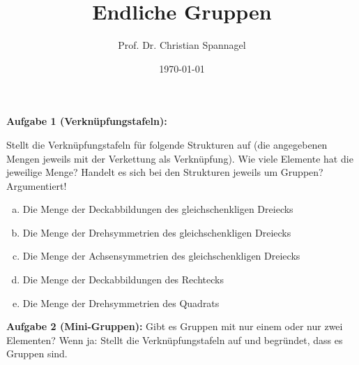 \documentclass{cssheet}
\title{Endliche Gruppen}
\author{Prof. Dr. Christian Spannagel}
\date{\today}
\begin{document}
\printtitle


\textbf{Aufgabe 1 (Verknüpfungstafeln):} 

Stellt die Verknüpfungstafeln für folgende Strukturen auf (die angegebenen Mengen jeweils mit der Verkettung als Verknüpfung). Wie viele Elemente hat die jeweilige Menge? Handelt es sich bei den Strukturen jeweils um Gruppen? Argumentiert!
\begin{enumerate}[a)]
\item Die Menge der Deckabbildungen des gleichschenkligen Dreiecks
\item Die Menge der Drehsymmetrien des gleichschenkligen Dreiecks
\item Die Menge der Achsensymmetrien des gleichschenkligen Dreiecks
\item Die Menge der Deckabbildungen des Rechtecks
\item Die Menge der Drehsymmetrien des Quadrats
\end{enumerate}

\textbf{Aufgabe 2 (Mini-Gruppen):}  Gibt es Gruppen mit nur einem oder nur zwei Elementen? Wenn ja: Stellt die Verknüpfungstafeln auf und begründet, dass es Gruppen sind.


\vspace*{2cm}
\printlicense

\printsocials
\end{document}
